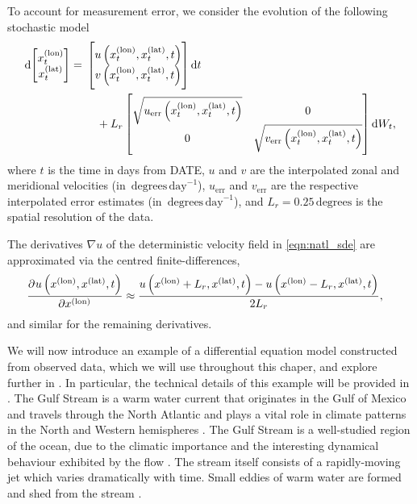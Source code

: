 To account for measurement error, we consider the evolution of the following stochastic model
\begin{equation}
	\dif \begin{bmatrix}
		x^{(\mathrm{lon})}_t \\ x^{(\mathrm{lat})}_t
	\end{bmatrix} = \begin{multlined}[t]
		\begin{bmatrix} u\left(x^{(\mathrm{lon})}_t, x^{(\mathrm{lat})}_t, t\right) \\ v\left(x^{(\mathrm{lon})}_t, x^{(\mathrm{lat})}_t, t\right) \end{bmatrix}\dif t \\
		+ L_r\begin{bmatrix}
			\sqrt{u_{\mathrm{err}}\left(x^{(\mathrm{lon})}_t, x^{(\mathrm{lat})}_t, t\right)} & 0                                                                                 \\
			0                                                                                 & \sqrt{v_{\mathrm{err}}\left(x^{(\mathrm{lon})}_t, x^{(\mathrm{lat})}_t, t\right)}
		\end{bmatrix} \dif W_t,
	\end{multlined}
	\label{eqn:natl_sde}
\end{equation}
where \(t\) is the time in days from DATE, \(u\) and \(v\) are the interpolated zonal and meridional velocities (in \(\mathrm{\,degrees\,day}^{-1}\)), \(u_{\mathrm{err}}\) and \(v_{\mathrm{err}}\) are the respective interpolated error estimates (in \(\mathrm{\,degrees\,day}^{-1}\)), and \(L_r = 0.25 \mathrm{\,degrees}\) is the spatial resolution of the data.



The derivatives \(\nabla u\) of the deterministic velocity field in \eqref{eqn:natl_sde} are approximated via the centred finite-differences,
\begin{align*}
	\dpd{u\left({x^{(\text{lon})}}, {x^{(\text{lat})}}, t\right)}{{x^{(\text{lon})}}} & \approx \frac{u\left(x^{(\text{lon})} + L_r, x^{(\text{lat})}, t\right) - u\left(x^{(\text{lon})} - L_r, x^{(\text{lat})}, t\right)}{2 L_r},
\end{align*}
and similar for the remaining derivatives.



We will now introduce an example of a differential equation model constructed from observed data, which we will use throughout this chaper, and explore further in .
In particular, the technical details of this example will be provided in .
The Gulf Stream is a warm water current that originates in the Gulf of Mexico and travels through the North Atlantic and plays a vital role in climate patterns in the North and Western hemispheres \citep{Palter_2015_RoleGulfStream}.
The Gulf Stream is a well-studied region of the ocean, due to the climatic importance and the interesting dynamical behaviour exhibited by the flow \citep{LiuEtAl_2018_GulfStreamTransport,another?}.
The stream itself consists of a rapidly-moving jet which varies dramatically with time.
Small eddies of warm water are formed and shed from the stream \citep{KangCurchitser_2013_GulfStreamEddy}.

